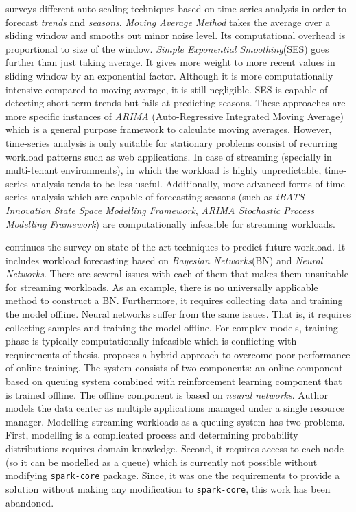 \textcite{Herbst:2013} surveys different auto-scaling techniques based on time-series analysis in order to forecast \emph{trends} and \emph{seasons}. \emph{Moving Average Method} takes the average over a sliding window and smooths out minor noise level. Its computational overhead is proportional to size of the window. \emph{Simple Exponential Smoothing}(SES) goes further than just taking average. It gives more weight to more recent values in sliding window by an exponential factor. Although it is more computationally intensive compared to moving average, it is still negligible. SES is capable of detecting short-term trends but fails at predicting seasons. These approaches are more specific instances of \emph{ARIMA} (Auto-Regressive Integrated Moving Average) which is a general purpose framework to calculate moving averages. However, time-series analysis is only suitable for stationary problems consist of recurring workload patterns such as web applications. In case of streaming (specially in multi-tenant environments), in which the workload is highly unpredictable, time-series analysis tends to be less useful. Additionally, more advanced forms of time-series analysis which are capable of forecasting seasons (such as \emph{tBATS Innovation State Space Modelling Framework}\cite{Alysha2011}, \emph{ARIMA Stochastic Process Modelling Framework}\cite{JSSv027i03}) are computationally infeasible for streaming workloads. \newline

\textcite{Herbst:2017} continues the survey on state of the art techniques to predict future workload. It includes workload forecasting based on \emph{Bayesian Networks}(BN) and \emph{Neural Networks}. There are several issues with each of them that makes them unsuitable for streaming workloads. As an example, there is no universally applicable method to construct a BN. Furthermore, it requires collecting data and training the model offline. Neural networks suffer from the same issues. That is, it requires collecting samples and training the model offline. For complex models, training phase is typically computationally infeasible which is conflicting with requirements of thesis.
\newpage
\textcite{Tesauro2006} proposes a hybrid approach to overcome poor performance of online training. The system consists of two components: an online component based on queuing system combined with reinforcement learning component that is trained offline. The offline component is based on \emph{neural networks}. Author models the data center as multiple applications managed under a single resource manager. Modelling streaming workloads as a queuing system has two problems. First, modelling is a complicated process and determining probability distributions requires domain knowledge. Second, it requires access to each node (so it can be modelled as a queue) which is currently not possible without modifying \lstinline$spark-core$ package. Since, it was one the requirements to provide a solution without making any modification to \lstinline$spark-core$, this work has been abandoned.\newline

